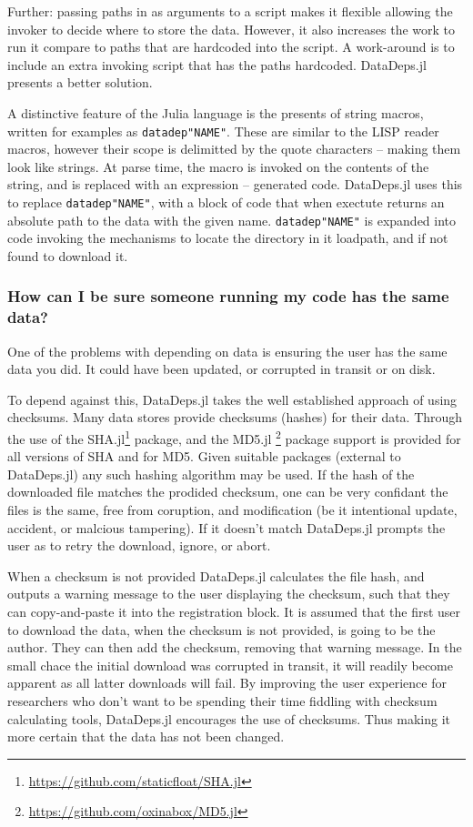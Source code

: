 \documentclass{jors}
\newcommand{\datadep}[1]{\texttt{datadep"{}#1"{}}}
\begin{document}
Further: passing paths in as arguments to a script makes it flexible allowing the invoker to decide where to store the data.
However, it also increases the work to run it compare to paths that are hardcoded into the script.
A work-around is to include an extra invoking script that has the paths hardcoded.
DataDeps.jl presents a better solution.

A distinctive feature of the Julia language is the presents of string macros, written for examples as \datadep{NAME}.
These are similar to the LISP reader macros, however their scope is delimitted by the quote characters -- making them look like strings.
At parse time, the macro is invoked on the contents of the string, and is replaced with an expression -- generated code.
DataDeps.jl uses this to replace \datadep{NAME}, with a block of code that when exectute returns an absolute path to the data with the given name.
\datadep{NAME} is expanded into code invoking the mechanisms to locate the directory in it loadpath, and if not found to download it.





\subsubsection{How can I be sure someone running my code has the same data?}
One of the problems with depending on data is ensuring the user has the same data you did.
It could have been updated, or corrupted in transit or on disk.

To depend against this, DataDeps.jl takes the well established approach of using checksums.
Many data stores provide checksums (hashes) for their data.
Through the use of the SHA.jl\footnote{\url{https://github.com/staticfloat/SHA.jl}} package, and the MD5.jl \footnote{\url{https://github.com/oxinabox/MD5.jl}} package support is provided for all versions of SHA and for MD5.
Given suitable packages (external to DataDeps.jl) any such hashing algorithm may be used.
If the hash of the downloaded file matches the prodided checksum, one can be very confidant the files is the same, free from coruption, and modification (be it intentional update, accident, or malcious tampering).
If it doesn't match DataDeps.jl prompts the user as to retry the download, ignore, or abort.


When a checksum is not provided DataDeps.jl calculates the file hash, and outputs a warning message to the user displaying the checksum, such that they can copy-and-paste it into the registration block.
It is assumed that the first user to download the data, when the checksum is not provided, is going to be the author.
They can then add the checksum, removing that warning message.
In the small chace the initial download was corrupted in transit, it will readily become apparent as all latter downloads will fail.
By improving the user experience for researchers who don't want to be spending their time fiddling with checksum calculating tools, DataDeps.jl encourages the use of checksums.
Thus making it more certain that the data has not been changed.
\end{document}
